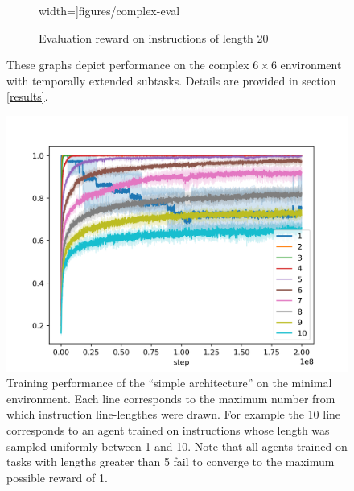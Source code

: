 \documentclass{article}
\begin{document}
\begin{figure}[th]
\begin{subfigure}{.5\textwidth}
{    width=\columnwidth]{figures/complex-eval}}
    \caption{Evaluation reward on instructions of length 20}
  \end{subfigure}%
  \caption{These graphs depict performance on the complex $6\times6$ environment
    with temporally extended subtasks. Details are provided in
section \ref{results}.}
  \label{complex}
\end{figure}

\begin{figure}[t]
\vskip 0.2in
\centerline{\includegraphics[width=\columnwidth]{simple-rewards}}
\caption{Training performance of the ``simple architecture'' on the minimal
environment. Each line corresponds to the maximum number from which
instruction line-lengthes were drawn. For example the 10 line corresponds to an
agent trained on instructions whose length was sampled uniformly between 1 and
10. Note that all agents trained on tasks with lengths greater than 5 fail to
converge to the maximum possible reward of 1.}
\label{grammer}
\vskip -0.2in
\end{figure}
\end{document}
